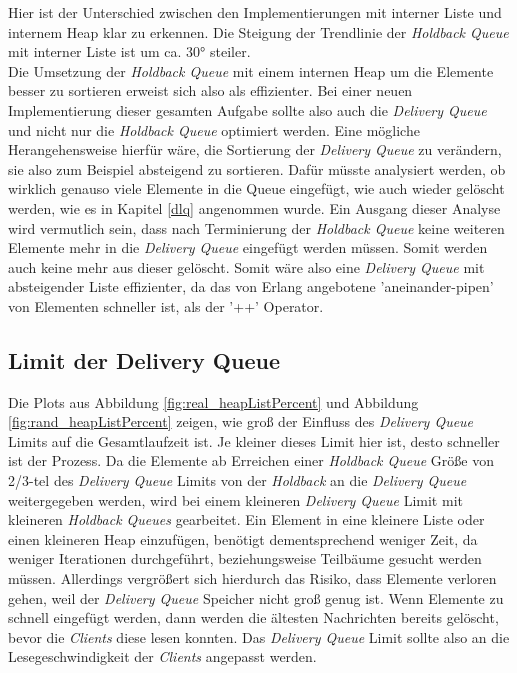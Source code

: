 Hier ist der Unterschied zwischen den Implementierungen mit interner Liste und internem Heap klar zu erkennen. Die Steigung der Trendlinie der \textit{Holdback Queue} mit interner Liste ist um ca. 30° steiler. \\ Die Umsetzung der \textit{Holdback Queue} mit einem internen Heap um die Elemente besser zu sortieren erweist sich also als effizienter. Bei einer neuen Implementierung dieser gesamten Aufgabe sollte also auch die \textit{Delivery Queue} und nicht nur die \textit{Holdback Queue} optimiert werden. Eine mögliche Herangehensweise hierfür wäre, die Sortierung der \textit{Delivery Queue} zu verändern, sie also zum Beispiel absteigend zu sortieren. Dafür müsste analysiert werden, ob wirklich genauso viele Elemente in die Queue eingefügt, wie auch wieder gelöscht werden, wie es in Kapitel \ref{dlq} angenommen wurde. Ein Ausgang dieser Analyse wird vermutlich sein, dass nach Terminierung der \textit{Holdback Queue} keine weiteren Elemente mehr in die \textit{Delivery Queue} eingefügt werden müssen. Somit werden auch keine mehr aus dieser gelöscht. Somit wäre also eine \textit{Delivery Queue} mit absteigender Liste effizienter, da das von Erlang angebotene 'aneinander-pipen' von Elementen schneller ist, als der '++' Operator.

\subsection{Limit der Delivery Queue}

Die Plots aus Abbildung \ref{fig:real_heapListPercent} und Abbildung \ref{fig:rand_heapListPercent} zeigen, wie groß der Einfluss des \textit{Delivery Queue} Limits auf die Gesamtlaufzeit ist. Je kleiner dieses Limit hier ist, desto schneller ist der Prozess. Da die Elemente ab Erreichen einer \textit{Holdback Queue} Größe von 2/3-tel des \textit{Delivery Queue} Limits von der \textit{Holdback} an die \textit{Delivery Queue} weitergegeben werden, wird bei einem kleineren \textit{Delivery Queue} Limit mit kleineren \textit{Holdback Queues} gearbeitet. Ein Element in eine kleinere Liste oder einen kleineren Heap einzufügen, benötigt dementsprechend weniger Zeit, da weniger Iterationen durchgeführt, beziehungsweise Teilbäume gesucht werden müssen. Allerdings vergrößert sich hierdurch das Risiko, dass Elemente verloren gehen, weil der \textit{Delivery Queue} Speicher nicht groß genug ist. Wenn Elemente zu schnell eingefügt werden, dann werden die ältesten Nachrichten bereits gelöscht, bevor die \textit{Clients} diese lesen konnten. Das \textit{Delivery Queue} Limit sollte also an die Lesegeschwindigkeit der \textit{Clients} angepasst werden.

